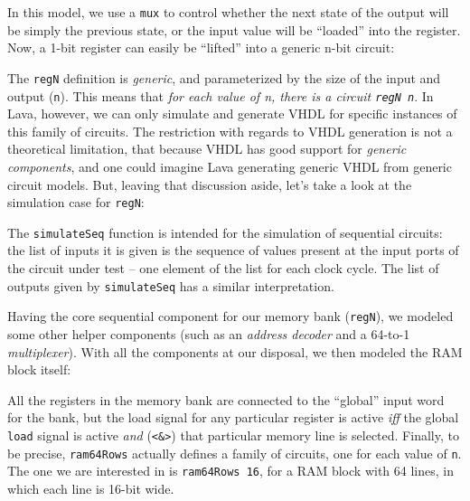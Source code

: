 
            In this model, we use a \texttt{mux} to control whether the next state of the output
            will be simply the previous state, or the input value will be ``loaded'' into the
            register. Now, a 1-bit register can easily be ``lifted'' into a generic n-bit circuit:


            The \texttt{regN} definition is \emph{generic}, and parameterized by the size of the
            input and output (\texttt{n}). This means that \emph{for each value of n, there is a
                circuit \texttt{regN n}}. In Lava, however, we can only simulate and generate VHDL
            for specific instances of this family of circuits. The restriction with regards to VHDL
            generation is not a theoretical limitation, that because VHDL has good support for
            \emph{generic components}, and one could imagine Lava generating generic VHDL from
            generic circuit models. But, leaving that discussion aside, let's take a look at the
            simulation case for \texttt{regN}:


            The \texttt{simulateSeq} function is intended for the simulation of sequential circuits:
            the list of inputs it is given is the sequence of values present at the input ports of
            the circuit under test -- one element of the list for each clock cycle. The list of
            outputs given by \texttt{simulateSeq} has a similar interpretation.

            Having the core sequential component for our memory bank (\texttt{regN}), we modeled
            some other helper components (such as an \emph{address decoder} and a 64-to-1
            \emph{multiplexer}). With all the components at our disposal, we then modeled the RAM
            block itself:


            All the registers in the memory bank are connected to the ``global'' input word for the
            bank, but the load signal for any particular register is active \emph{iff} the global
            \texttt{load} signal is active \emph{and} (\texttt{<\&>}) that particular memory line is
            selected. Finally, to be precise, \texttt{ram64Rows} actually defines a family of
            circuits, one for each value of \texttt{n}. The one we are interested in is
            \texttt{ram64Rows 16}, for a RAM block with 64 lines, in which each line is 16-bit
            wide.

